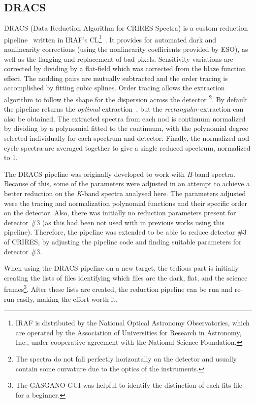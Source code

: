 \subsection{{DRACS}}
\label{subsec:dracs}
{DRACS} (Data Reduction Algorithm for {CRIRES} Spectra) is a custom reduction pipeline~\citep{figueira_radial_2010} written in {IRAF}'s CL\footnote{{IRAF} is distributed by the National Optical Astronomy Observatories, which are operated by the Association of Universities for Research in Astronomy, {Inc.}, under cooperative agreement with the National Science Foundation.}~\citep{tody_iraf_1993}.
It provides for automated dark and nonlinearity corrections (using the nonlinearity coefficients provided by {ESO}), as well as the flagging and replacement of bad pixels.
Sensitivity variations are corrected by dividing by a flat-field which was corrected from the blaze function effect.
The nodding pairs are mutually subtracted and the order tracing is accomplished by fitting cubic splines.
Order tracing allows the extraction algorithm to follow the shape for the dispersion across the detector \footnote{The spectra do not fall perfectly horizontally on the detector and usually contain some curvature due to the optics of the instruments.}.
By default the pipeline returns the \emph{optimal} extraction~\citep{horne_optimal_1986}, but the \emph{rectangular} extraction can also be obtained.
The extracted spectra from each nod is continuum normalized by dividing by a polynomial fitted to the continuum, with the polynomial degree selected individually for each spectrum and detector.
Finally, the normalized nod-cycle spectra are averaged together to give a single reduced spectrum, normalized to 1.

The {DRACS} pipeline was originally developed to work with \emph{H}-band spectra.
Because of this, some of the parameters were adjusted in an attempt to achieve a better reduction on the \emph{K}-band spectra analysed here.
The parameters adjusted were the tracing and normalization polynomial functions and their specific order on the detector.
Also, there was initially no reduction parameters present for detector \#3 (as this had been not used with in previous works using this pipeline).
Therefore, the pipeline was extended to be able to reduce detector \#3 of CRIRES, by adjusting the pipeline code and finding suitable parameters for detector \#3.

When using the {DRACS} pipeline on a new target, the tedious part is initially creating the lists of files identifying which files are the dark, flat, and the science frames\footnote{The GASGANO GUI was helpful to identify the distinction of each fits file for a beginner.}.
After these lists are created, the reduction pipeline can be run and re-run easily, making the effort worth it.


